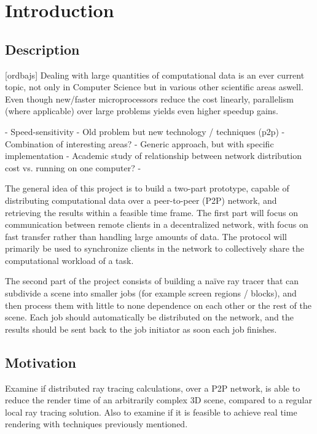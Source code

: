 \chapter{Introduction}
 
\section{Description}

[ordbajs]
Dealing with large quantities of computational data is an ever current topic, not only in Computer Science but in various other scientific areas aswell. Even though new/faster microprocessors reduce the cost linearly, parallelism (where applicable) over large problems yields even higher speedup gains. 


- Speed-sensitivity
- Old problem but new technology / techniques (p2p)
- Combination of interesting areas?
- Generic approach, but with specific implementation
- Academic study of relationship between network distribution cost vs. running on one computer?
-  

The general idea of this project is to build a two-part prototype, capable of distributing computational data over a peer-to-peer (P2P) network, and retrieving the results within a feasible time frame. The first part will focus on communication between remote clients in a decentralized network, with focus on fast transfer rather than handling large amounts of data. The protocol will primarily be used to synchronize clients in the network to collectively share the computational workload of a task. 

The second part of the project consists of building a naïve ray tracer that can subdivide a scene into smaller jobs (for example screen regions / blocks), and then process them with little to none dependence on each other or the rest of the scene. Each job should automatically be distributed on the network, and the results should be sent back to the job initiator as soon each job finishes.

\section{Motivation}
Examine if distributed ray tracing calculations, over a P2P network, is able to reduce the render time of an arbitrarily complex 3D scene, compared to a regular local ray tracing solution. Also to examine if it is feasible to achieve real time rendering with techniques previously mentioned.
 